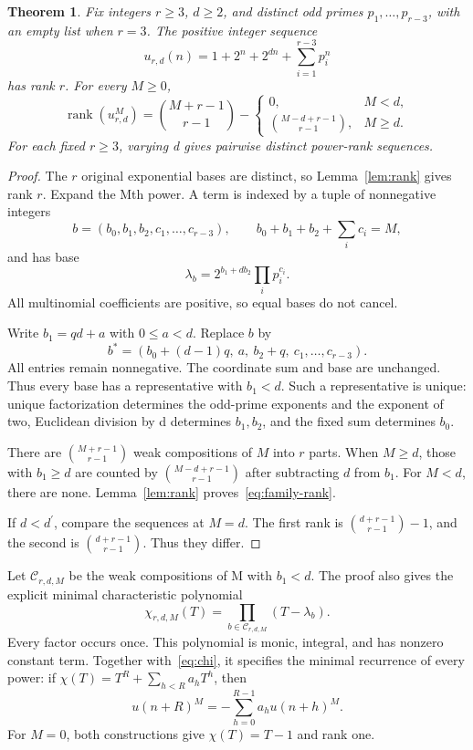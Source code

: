 \documentclass[11pt,a4paper]{article}
\newtheorem{theorem}{Theorem}
\newcommand{\rank}{\operatorname{rank}}
\begin{document}
\begin{theorem}\label{thm:family}
Fix integers $r\ge3$, $d\ge2$, and distinct odd primes
$p_1,\ldots,p_{r-3}$, with an empty list when $r=3$. The positive integer sequence
\[
 u_{r,d}(n)=1+2^n+2^{dn}+\sum_{i=1}^{r-3}p_i^n
\]
has rank $r$. For every $M\ge0$,
\begin{equation}\label{eq:family-rank}
 \rank(u_{r,d}^M)=\binom{M+r-1}{r-1}
 -\begin{cases}
 0,&M<d,\\
 \binom{M-d+r-1}{r-1},&M\ge d.
 \end{cases}
\end{equation}
For each fixed $r\ge3$, varying d gives pairwise distinct power-rank sequences.
\end{theorem}
\begin{proof}
The $r$ original exponential bases are distinct, so Lemma~\ref{lem:rank}
gives rank $r$. Expand the Mth power. A term is indexed by a tuple of nonnegative integers
\[
 b=(b_0,b_1,b_2,c_1,\ldots,c_{r-3}),\qquad
 b_0+b_1+b_2+\sum_i c_i=M,
\]
and has base
\begin{equation}\label{eq:base}
 \lambda_b=2^{b_1+db_2}\prod_i p_i^{c_i}.
\end{equation}
All multinomial coefficients are positive, so equal bases do not cancel.

Write $b_1=qd+a$ with $0\le a<d$. Replace $b$ by
\[
 b^*=(b_0+(d-1)q,\ a,\ b_2+q,\ c_1,\ldots,c_{r-3}).
\]
All entries remain nonnegative. The coordinate sum and base are unchanged.
Thus every base has a representative with $b_1<d$.
Such a representative is unique: unique factorization determines the
odd-prime exponents and the exponent of two, Euclidean division by d
determines $b_1,b_2$, and the fixed sum determines $b_0$.

There are $\binom{M+r-1}{r-1}$ weak compositions of $M$ into $r$ parts.
When $M\ge d$, those with $b_1\ge d$ are counted by
$\binom{M-d+r-1}{r-1}$ after subtracting $d$ from $b_1$.
For $M<d$, there are none. Lemma~\ref{lem:rank} proves~\eqref{eq:family-rank}.

If $d<d^\prime$, compare the sequences at $M=d$. The first rank is
$\binom{d+r-1}{r-1}-1$, and the second is $\binom{d+r-1}{r-1}$.
Thus they differ.
\end{proof}

Let $\mathcal C_{r,d,M}$ be the weak compositions of M with $b_1<d$.
The proof also gives the explicit minimal characteristic polynomial
\begin{equation}\label{eq:family-chi}
 \chi_{r,d,M}(T)=\prod_{b\in\mathcal C_{r,d,M}}(T-\lambda_b).
\end{equation}
Every factor occurs once. This polynomial is monic, integral, and has
nonzero constant term. Together with~\eqref{eq:chi}, it specifies the
minimal recurrence of every power: if $\chi(T)=T^R+\sum_{h<R}a_hT^h$, then
\[
 u(n+R)^M=-\sum_{h=0}^{R-1}a_hu(n+h)^M.
\]
For $M=0$, both constructions give $\chi(T)=T-1$ and rank one.
\end{document}
